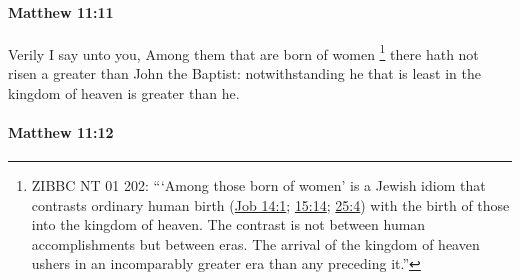 		\paragraph{Matthew 11:11} %
			\label{MATTHEW-11-11}

			Verily I say unto you, Among them that are born of women%
				\footnote{%
					ZIBBC NT 01 202: ```Among those born of women' is a Jewish idiom that contrasts ordinary human birth (\hyperref[JOB-14-1]{Job 14:1}; \hyperref[JOB-15-14]{15:14}; \hyperref[JOB-25-4]{25:4}) with the birth of those into the kingdom of heaven. The contrast is not between human accomplishments but between eras. The arrival of the kingdom of heaven ushers in an incomparably greater era than any preceding it.''
					}
			there hath not risen a greater than John the Baptist: notwithstanding he that is least in the kingdom of heaven is greater than he.

			\begin{framed}
			\scriptsize
				\begin{compactdesc}
					\item[SBLG] 
				\end{compactdesc}
			\end{framed}

		\paragraph{Matthew 11:12} %
			\label{MATTHEW-11-12}

